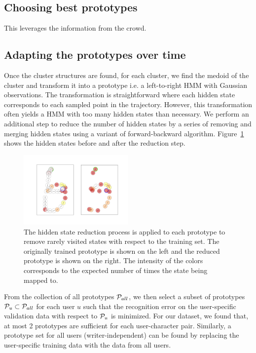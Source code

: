 \documentclass{sigchi}
\begin{document}
\subsection{Choosing best prototypes}

This leverages the information from the crowd.

\subsection{Adapting the prototypes over time}


Once the cluster structures are found, for each cluster, we find the
medoid of the cluster and transform it into a prototype i.e. a
left-to-right HMM with Gaussian observations. The transformation is
straightforward where each hidden state corresponds to each sampled
point in the trajectory. However, this transformation often yields a
HMM with too many hidden states than necessary. We perform an additional
step to reduce the number of hidden states by a series of removing and
merging hidden states using a variant of forward-backward
algorithm. Figure~\ref{fig:state_reduction} shows the hidden states
before and after the reduction step.

\begin{figure}[h]
  \centering
  \includegraphics[width=0.5\textwidth] {figures/state_reduction.png}
  \caption{The hidden state reduction process is applied to each
    prototype to remove rarely visited states with respect to the
    training set. The originally trained prototype is shown on the
    left and the reduced prototype is shown on the right. The
    intensity of the colors corresponds to the expected number of
    times the state being mapped to. }
  \label{fig:state_reduction}
\end{figure}

From the collection of all prototypes $\mathcal{P}_{all}$, we then
select a subset of prototypes $\mathcal{P}_u \subset
\mathcal{P}_{all}$ for each user $u$ such that the recognition error
on the user-specific validation data with respect to $\mathcal{P}_u$
is minimized. For our dataset, we found that, at most 2
prototypes are sufficient for each user-character pair. Similarly, a
prototype set for all users (writer-independent) can be found by
replacing the user-specific training data with the data from all users.
\end{document}
